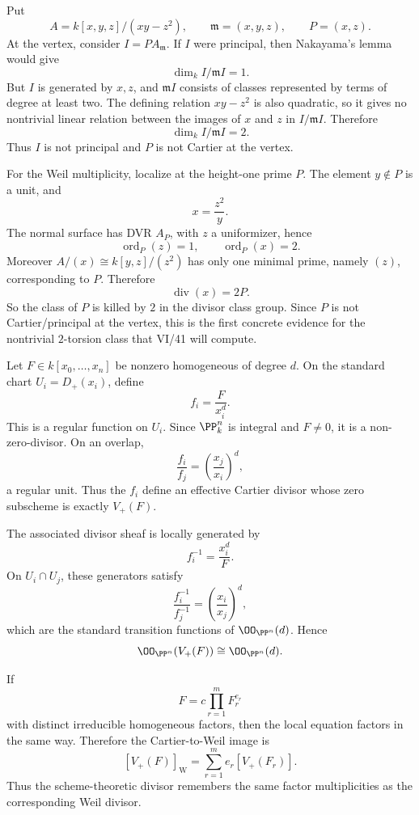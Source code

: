 \begin{solution}
Put
\[
A=k[x,y,z]/(xy-z^2),\qquad
\mathfrak m=(x,y,z),\qquad
P=(x,z).
\]
At the vertex, consider \(I=P A_{\mathfrak m}\).  If \(I\) were principal, then Nakayama's lemma would give
\[
\dim_k I/\mathfrak m I=1.
\]
But \(I\) is generated by \(x,z\), and \(\mathfrak m I\) consists of classes represented by terms of degree at least two.  The defining relation \(xy-z^2\) is also quadratic, so it gives no nontrivial linear relation between the images of \(x\) and \(z\) in \(I/\mathfrak m I\).  Therefore
\[
\dim_k I/\mathfrak m I=2.
\]
Thus \(I\) is not principal and \(P\) is not Cartier at the vertex.

For the Weil multiplicity, localize at the height-one prime \(P\).  The element \(y\notin P\) is a unit, and
\[
x=\frac{z^2}{y}.
\]
The normal surface has DVR \(A_P\), with \(z\) a uniformizer, hence
\[
\operatorname{ord}_P(z)=1,
\qquad
\operatorname{ord}_P(x)=2.
\]
Moreover \(A/(x)\cong k[y,z]/(z^2)\) has only one minimal prime, namely \((z)\), corresponding to \(P\).  Therefore
\[
\operatorname{div}(x)=2P.
\]
So the class of \(P\) is killed by \(2\) in the divisor class group.  Since \(P\) is not Cartier/principal at the vertex, this is the first concrete evidence for the nontrivial \(2\)-torsion class that VI/41 will compute.
\end{solution}

\begin{solution}
Let \(F\in k[x_0,\ldots,x_n]\) be nonzero homogeneous of degree \(d\).  On the standard chart \(U_i=D_+(x_i)\), define
\[
f_i=\frac{F}{x_i^d}.
\]
This is a regular function on \(U_i\).  Since \(\PP^n_k\) is integral and \(F\neq0\), it is a non-zero-divisor.  On an overlap,
\[
\frac{f_i}{f_j}
=\left(\frac{x_j}{x_i}\right)^d,
\]
a regular unit.  Thus the \(f_i\) define an effective Cartier divisor whose zero subscheme is exactly \(V_+(F)\).

The associated divisor sheaf is locally generated by
\[
f_i^{-1}=\frac{x_i^d}{F}.
\]
On \(U_i\cap U_j\), these generators satisfy
\[
\frac{f_i^{-1}}{f_j^{-1}}
=\left(\frac{x_i}{x_j}\right)^d,
\]
which are the standard transition functions of \(\OO_{\PP^n}(d)\).  Hence
\[
\OO_{\PP^n}(V_+(F))\cong\OO_{\PP^n}(d).
\]

If
\[
F=c\prod_{r=1}^m F_r^{e_r}
\]
with distinct irreducible homogeneous factors, then the local equation factors in the same way.  Therefore the Cartier-to-Weil image is
\[
[V_+(F)]_{\mathrm W}=\sum_{r=1}^m e_r[V_+(F_r)].
\]
Thus the scheme-theoretic divisor remembers the same factor multiplicities as the corresponding Weil divisor.
\end{solution}

